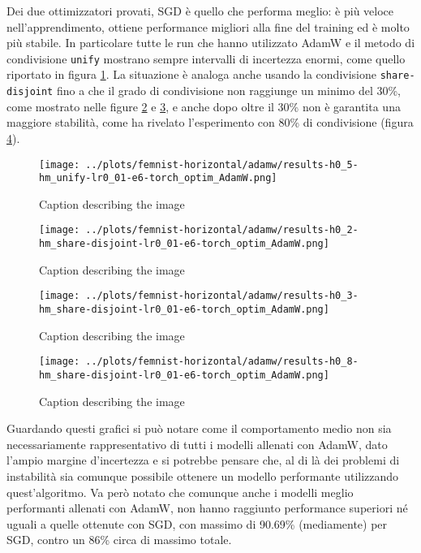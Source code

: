 Dei due ottimizzatori provati, SGD è quello che performa meglio: è più 
veloce nell'apprendimento, ottiene performance migliori alla fine del 
training ed è molto più stabile. In particolare tutte le run che hanno 
utilizzato AdamW e il metodo di condivisione \texttt{unify} mostrano 
sempre intervalli di incertezza enormi, come quello riportato in 
figura \ref{fig:feministu5adam}. La situazione è analoga anche usando 
la condivisione \texttt{share-disjoint} fino a che il grado di 
condivisione non raggiunge un minimo del 30\%, come mostrato nelle 
figure \ref{fig:feminists2adam} e \ref{fig:feminists3adam}, e anche 
dopo oltre il 30\% non è garantita una maggiore stabilità, come ha 
rivelato l'esperimento con 80\% di condivisione (figura \ref{fig:feminists8adam}).
\begin{figure}[htbp]  %
    \centering
    \texttt{[image: ../plots/femnist-horizontal/adamw/results-h0\_5-hm\_unify-lr0\_01-e6-torch\_optim\_AdamW.png]}  %
    \caption{Caption describing the image}
    \label{fig:feministu5adam}
\end{figure}
\begin{figure}[htbp]  %
    \centering
    \texttt{[image: ../plots/femnist-horizontal/adamw/results-h0\_2-hm\_share-disjoint-lr0\_01-e6-torch\_optim\_AdamW.png]}  %
    \caption{Caption describing the image}
    \label{fig:feminists2adam}
\end{figure}
\begin{figure}[htbp]  %
    \centering
    \texttt{[image: ../plots/femnist-horizontal/adamw/results-h0\_3-hm\_share-disjoint-lr0\_01-e6-torch\_optim\_AdamW.png]}  %
    \caption{Caption describing the image}
    \label{fig:feminists3adam}
\end{figure}
\begin{figure}[htbp]  %
    \centering
    \texttt{[image: ../plots/femnist-horizontal/adamw/results-h0\_8-hm\_share-disjoint-lr0\_01-e6-torch\_optim\_AdamW.png]}  %
    \caption{Caption describing the image}
    \label{fig:feminists8adam}
\end{figure}

Guardando questi grafici si può notare come il comportamento medio non sia 
necessariamente rappresentativo di tutti i modelli allenati con AdamW, dato 
l'ampio margine d'incertezza e si potrebbe pensare che, al di là dei problemi 
di instabilità sia comunque possibile ottenere un modello performante
utilizzando quest'algoritmo. Va però notato che comunque anche i modelli 
meglio performanti allenati con AdamW, non hanno raggiunto performance 
superiori né uguali a quelle ottenute con SGD, con massimo di 90.69\%
(mediamente) per SGD, contro un 86\% circa di massimo totale.

